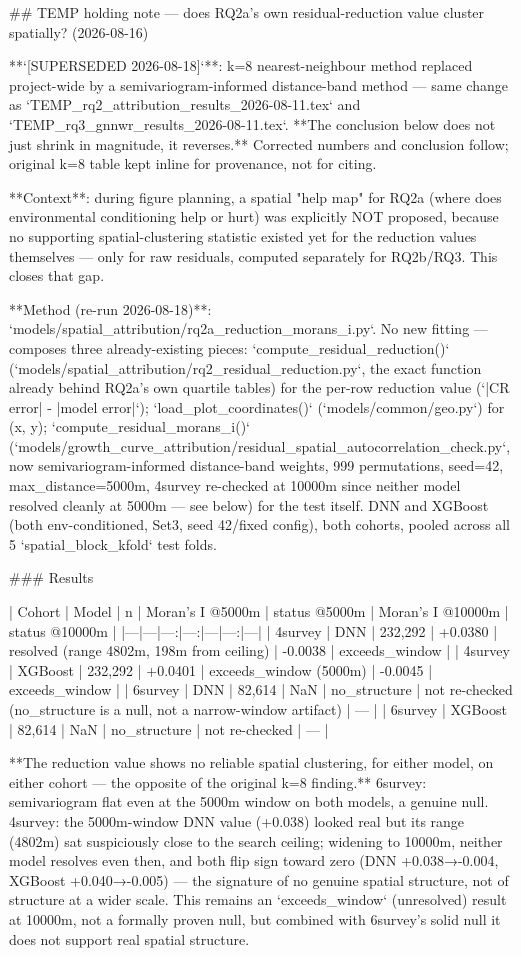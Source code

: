 ## TEMP holding note — does RQ2a's own residual-reduction value cluster spatially? (2026-08-16)

**`[SUPERSEDED 2026-08-18]`**: k=8 nearest-neighbour method replaced project-wide by a
semivariogram-informed distance-band method — same change as `TEMP_rq2_attribution_results_2026-08-11.tex`
and `TEMP_rq3_gnnwr_results_2026-08-11.tex`. **The conclusion below does not just shrink in
magnitude, it reverses.** Corrected numbers and conclusion follow; original k=8 table kept inline
for provenance, not for citing.

**Context**: during figure planning, a spatial "help map" for RQ2a (where does environmental
conditioning help or hurt) was explicitly NOT proposed, because no supporting spatial-clustering
statistic existed yet for the reduction values themselves — only for raw residuals, computed
separately for RQ2b/RQ3. This closes that gap.

**Method (re-run 2026-08-18)**: `models/spatial_attribution/rq2a_reduction_morans_i.py`. No new
fitting — composes three already-existing pieces: `compute_residual_reduction()`
(`models/spatial_attribution/rq2_residual_reduction.py`, the exact function already behind RQ2a's
own quartile tables) for the per-row reduction value (`|CR error| - |model error|`);
`load_plot_coordinates()` (`models/common/geo.py`) for (x, y); `compute_residual_morans_i()`
(`models/growth_curve_attribution/residual_spatial_autocorrelation_check.py`, now
semivariogram-informed distance-band weights, 999 permutations, seed=42, max_distance=5000m,
4survey re-checked at 10000m since neither model resolved cleanly at 5000m — see below) for the
test itself. DNN and XGBoost (both env-conditioned, Set3, seed 42/fixed config), both cohorts,
pooled across all 5 `spatial_block_kfold` test folds.

### Results

| Cohort | Model | n | Moran's I @5000m | status @5000m | Moran's I @10000m | status @10000m |
|---|---|---:|---:|---|---:|---|
| 4survey | DNN | 232,292 | +0.0380 | resolved (range 4802m, 198m from ceiling) | -0.0038 | exceeds_window |
| 4survey | XGBoost | 232,292 | +0.0401 | exceeds_window (5000m) | -0.0045 | exceeds_window |
| 6survey | DNN | 82,614 | NaN | no_structure | not re-checked (no_structure is a null, not a narrow-window artifact) | — |
| 6survey | XGBoost | 82,614 | NaN | no_structure | not re-checked | — |

**The reduction value shows no reliable spatial clustering, for either model, on either cohort —
the opposite of the original k=8 finding.** 6survey: semivariogram flat even at the 5000m window on
both models, a genuine null. 4survey: the 5000m-window DNN value (+0.038) looked real but its range
(4802m) sat suspiciously close to the search ceiling; widening to 10000m, neither model resolves
even then, and both flip sign toward zero (DNN +0.038→-0.004, XGBoost +0.040→-0.005) — the
signature of no genuine spatial structure, not of structure at a wider scale. This remains an
`exceeds_window` (unresolved) result at 10000m, not a formally proven null, but combined with
6survey's solid null it does not support real spatial structure.

